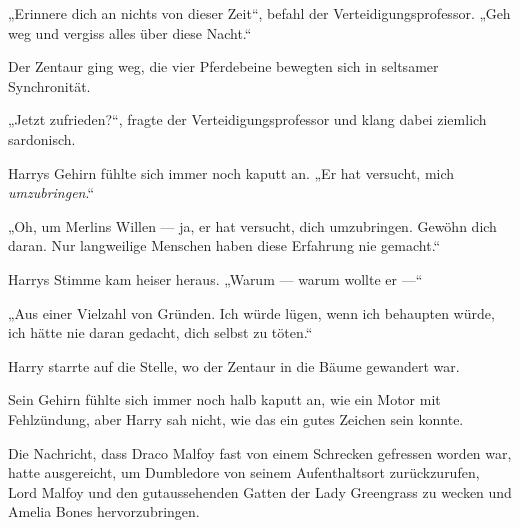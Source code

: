 „Erinnere dich an nichts von dieser Zeit“, befahl der Verteidigungsprofessor.
„Geh weg und vergiss alles über diese Nacht.“

Der Zentaur ging weg, die vier Pferdebeine bewegten sich in seltsamer Synchronität.

„Jetzt zufrieden?“, fragte der Verteidigungsprofessor und klang dabei ziemlich sardonisch.

Harrys Gehirn fühlte sich immer noch kaputt an.
„Er hat versucht, mich \emph{umzubringen}.“

„Oh, um Merlins Willen — ja, er hat versucht, dich umzubringen. Gewöhn dich daran. Nur langweilige Menschen haben diese Erfahrung nie gemacht.“

Harrys Stimme kam heiser heraus.
„Warum — warum wollte er —“

„Aus einer Vielzahl von Gründen. Ich würde lügen, wenn ich behaupten würde, ich hätte nie daran gedacht, dich selbst zu töten.“

Harry starrte auf die Stelle, wo der Zentaur in die Bäume gewandert war.

Sein Gehirn fühlte sich immer noch halb kaputt an, wie ein Motor mit Fehlzündung, aber Harry sah nicht, wie das ein gutes Zeichen sein konnte.

\later

Die Nachricht, dass Draco Malfoy fast von einem Schrecken gefressen worden war, hatte ausgereicht, um Dumbledore von seinem Aufenthaltsort zurückzurufen, Lord Malfoy und den gutaussehenden Gatten der Lady Greengrass zu wecken und Amelia Bones hervorzubringen.

